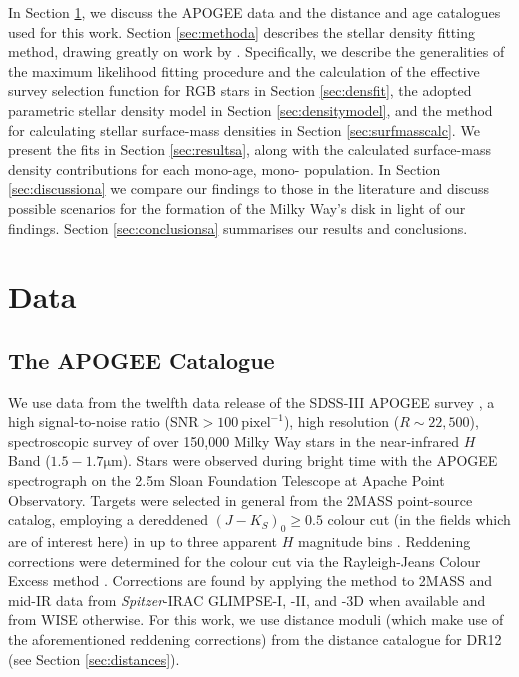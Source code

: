 In Section \ref{sec:dataa}, we discuss the APOGEE data and the distance and age catalogues used for this work. Section \ref{sec:methoda} describes the stellar density fitting method, drawing greatly on work by \citet{2016ApJ...818..130B,2016ApJ...823...30B}. Specifically, we describe the generalities of the maximum likelihood fitting procedure and the calculation of the effective survey selection function for RGB stars in Section \ref{sec:densfit}, the adopted parametric stellar density model in Section \ref{sec:densitymodel}, and the method for calculating stellar surface-mass densities in Section \ref{sec:surfmasscalc}. We present the fits in Section \ref{sec:resultsa}, along with the calculated surface-mass density contributions for each mono-age, mono-\feh{} population. In Section \ref{sec:discussiona} we compare our findings to those in the literature and discuss possible scenarios for the formation of the Milky Way's disk in light of our findings. Section \ref{sec:conclusionsa} summarises our results and conclusions. 


\section{Data}

\label{sec:dataa}
\subsection{The APOGEE Catalogue}
\label{sec:APOGEE}
We use data from the twelfth data release \citep[DR12,][]{2015ApJS..219...12A} of the SDSS-III APOGEE survey \citep[][]{2015arXiv150905420M}, a high signal-to-noise ratio (SNR$>100\ \mathrm{pixel}^{-1}$), high resolution ($R \sim 22,500$), spectroscopic survey of over 150,000 Milky Way stars in the near-infrared $H$ Band ($1.5 - 1.7 \mathrm{\mu m}$). Stars were observed during bright time with the APOGEE spectrograph \citep{2010SPIE.7735E..1CW} on the 2.5m Sloan Foundation Telescope \citep{2006AJ....131.2332G} at Apache Point Observatory. Targets were selected in general from the 2MASS point-source catalog, employing a dereddened $(J-K_S)_0 \geq 0.5$ colour cut (in the fields which are of interest here) in up to three apparent $H$ magnitude bins \citep[for a full description of the APOGEE target selection, see][]{2013AJ....146...81Z}. Reddening corrections were determined for the colour cut via the Rayleigh-Jeans Colour Excess method \citep[RJCE,][]{2011ApJ...739...25M}. Corrections are found by applying the method to 2MASS \citep{2006AJ....131.1163S} and mid-IR data from \emph{Spitzer}-IRAC GLIMPSE-I, -II, and -3D \citep{2009PASP..121..213C} when available and from WISE \citep{2010AJ....140.1868W} otherwise. For this work, we use distance moduli (which make use of the aforementioned reddening corrections) from the \citet{2015ApJ...808..132H} distance catalogue for DR12 (see Section \ref{sec:distances}). 


